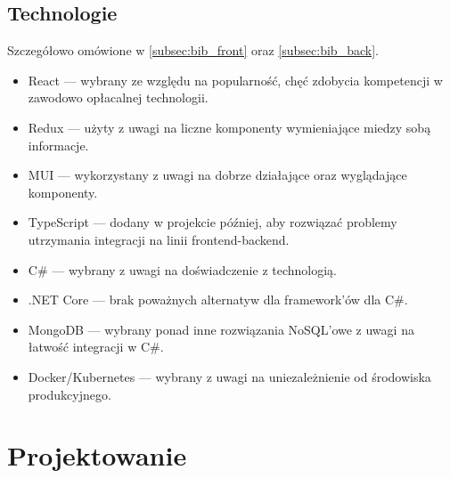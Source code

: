 \documentclass[a4paper,11pt]{report}
\begin{document}
\section{Technologie}
Szczegółowo omówione w \ref{subsec:bib_front} oraz \ref{subsec:bib_back}.
		\begin{itemize}
			\item React — wybrany ze względu na popularność, chęć zdobycia kompetencji w zawodowo opłacalnej technologii.
			\item Redux — użyty z uwagi na liczne komponenty wymieniające miedzy sobą informacje.
			\item MUI — wykorzystany z uwagi na dobrze działające oraz wyglądające komponenty. 
			\item TypeScript — dodany w projekcie później, aby rozwiązać problemy utrzymania integracji na linii frontend-backend.
			\item C\# — wybrany z uwagi na doświadczenie z technologią.
			\item .NET Core — brak poważnych alternatyw dla framework'ów dla C\#.
			\item MongoDB — wybrany ponad inne rozwiązania NoSQL'owe z uwagi na łatwość integracji w C\#.
			\item Docker/Kubernetes — wybrany z uwagi na uniezależnienie od środowiska produkcyjnego.
		\end{itemize}

\chapter {Projektowanie}
\end{document}
